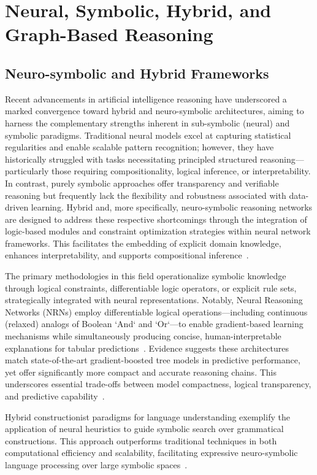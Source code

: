 \documentclass[sigconf]{acmart}
\begin{document}
\section{Neural, Symbolic, Hybrid, and Graph-Based Reasoning}

\subsection{Neuro-symbolic and Hybrid Frameworks}

Recent advancements in artificial intelligence reasoning have underscored a marked convergence toward hybrid and neuro-symbolic architectures, aiming to harness the complementary strengths inherent in sub-symbolic (neural) and symbolic paradigms. Traditional neural models excel at capturing statistical regularities and enable scalable pattern recognition; however, they have historically struggled with tasks necessitating principled structured reasoning—particularly those requiring compositionality, logical inference, or interpretability. In contrast, purely symbolic approaches offer transparency and verifiable reasoning but frequently lack the flexibility and robustness associated with data-driven learning. Hybrid and, more specifically, neuro-symbolic reasoning networks are designed to address these respective shortcomings through the integration of logic-based modules and constraint optimization strategies within neural network frameworks. This facilitates the embedding of explicit domain knowledge, enhances interpretability, and supports compositional inference~\cite{ref93,ref1,ref10,ref11,ref22,ref42,ref45,ref49,ref54,ref56,ref68,ref86}.

The primary methodologies in this field operationalize symbolic knowledge through logical constraints, differentiable logic operators, or explicit rule sets, strategically integrated with neural representations. Notably, Neural Reasoning Networks (NRNs) employ differentiable logical operations—including continuous (relaxed) analogs of Boolean `And` and `Or`—to enable gradient-based learning mechanisms while simultaneously producing concise, human-interpretable explanations for tabular predictions~\cite{ref93}. Evidence suggests these architectures match state-of-the-art gradient-boosted tree models in predictive performance, yet offer significantly more compact and accurate reasoning chains. This underscores essential trade-offs between model compactness, logical transparency, and predictive capability~\cite{ref93,ref49}.

Hybrid constructionist paradigms for language understanding exemplify the application of neural heuristics to guide symbolic search over grammatical constructions. This approach outperforms traditional techniques in both computational efficiency and scalability, facilitating expressive neuro-symbolic language processing over large symbolic spaces~\cite{ref54}.
\end{document}
